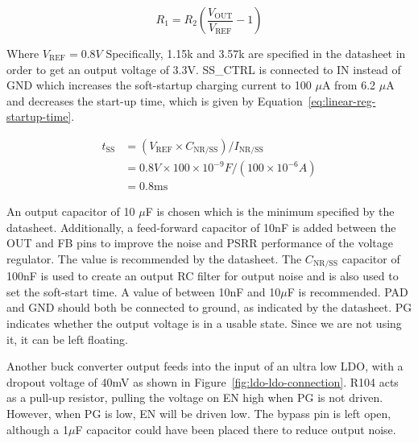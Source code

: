 \begin{equation}
  R_1 = R_2\left(\frac{V_{\text{OUT}}}{V_{\text{REF}}}-1\right) \label{eq:linear-reg-vout}
\end{equation}

Where $V_{\text{REF}} = 0.8V$ Specifically, 1.15k and 3.57k are specified in the datasheet in order
to get an output voltage of 3.3V. SS\_CTRL is connected to IN instead of GND which increases the
soft-startup charging current to 100 $\mu$A from 6.2 $\mu$A and decreases the start-up time, which
is given by Equation~\ref{eq:linear-reg-startup-time}.

\begin{align}
  t_{\text{SS}} &= (V_{\text{REF}} \times C_{\text{NR/SS}}) /
                  I_{\text{NR/SS}} \label{eq:linear-reg-startup-time} \\
                &= 0.8V \times 100 \times 10^{-9} F/(100 \times 10^{-6} A) \\
                &= 0.8\text{ms}
\end{align}

An output capacitor of 10 $\mu$F is chosen which is the minimum specified by the
datasheet. Additionally, a feed-forward capacitor of 10nF is added between the OUT and FB pins to
improve the noise and PSRR performance of the voltage regulator. The value is recommended by the
datasheet. The $C_{\text{NR/SS}}$ capacitor of 100nF is used to create an output RC filter for
output noise and is also used to set the soft-start time. A value of between 10nF and 10$\mu$F is
recommended. PAD and GND should both be connected to ground, as indicated by the datasheet. PG
indicates whether the output voltage is in a usable state. Since we are not using it, it can be left
floating.

Another buck converter output feeds into the input of an ultra low LDO, with a dropout voltage of
40mV as shown in Figure~\ref{fig:ldo-ldo-connection}. R104 acts as a pull-up resistor, pulling the
voltage on EN high when PG is not driven. However, when PG is low, EN will be driven low. The bypass
pin is left open, although a 1$\mu$F capacitor could have been placed there to reduce output noise.

